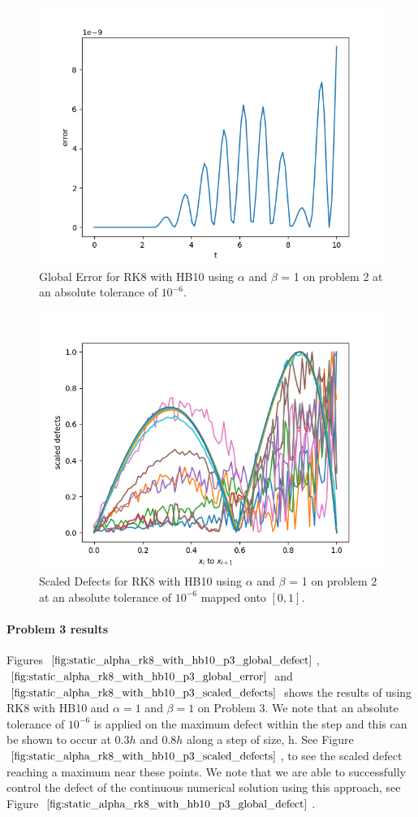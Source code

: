 \begin{figure}[H]
\centering
\includegraphics[width=0.7\linewidth]{./figures/static_alpha_rk8_with_hb10_p2_global_error}
\caption{Global Error for RK8 with HB10 using $\alpha$ and $\beta$ = 1 on problem 2 at an absolute tolerance of $10^{-6}$.}
\label{fig:static_alpha_rk8_with_hb10_p2_global_error}
\end{figure}

\begin{figure}[H]
\centering
\includegraphics[width=0.7\linewidth]{./figures/static_alpha_rk8_with_hb10_p2_scaled_defects}
\caption{Scaled Defects for RK8 with HB10 using $\alpha$ and $\beta$ = 1 on problem 2 at an absolute tolerance of $10^{-6}$ mapped onto $[0, 1]$.}
\label{fig:static_alpha_rk8_with_hb10_p2_scaled_defects}
\end{figure}

\paragraph{Problem 3 results}
Figures $\ref{fig:static_alpha_rk8_with_hb10_p3_global_defect}$, $\ref{fig:static_alpha_rk8_with_hb10_p3_global_error}$ and $\ref{fig:static_alpha_rk8_with_hb10_p3_scaled_defects}$ shows the results of using RK8 with HB10 and $\alpha = 1$ and $\beta = 1$ on Problem 3. We note that an absolute tolerance of $10^{-6}$ is applied on the maximum defect within the step and this can be shown to occur at $0.3h$ and $0.8h$ along a step of size, h. See Figure $\ref{fig:static_alpha_rk8_with_hb10_p3_scaled_defects}$, to see the scaled defect reaching a maximum near these points. We note that we are able to successfully control the defect of the continuous numerical solution using this approach, see Figure $\ref{fig:static_alpha_rk8_with_hb10_p3_global_defect}$. 

